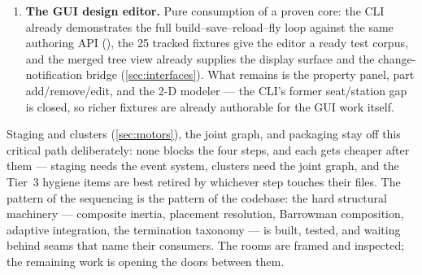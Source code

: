 \begin{enumerate}
  \item \textbf{The GUI design editor.} Pure consumption of a proven core: the CLI already
  demonstrates the full build--save--reload--fly loop against the same authoring API
  (), the 25 tracked  fixtures give the editor a ready test
  corpus, and the merged tree view already supplies the display surface and the
  change-notification bridge (\cref{sec:interfaces}). What remains is the property panel, part
  add/remove/edit, and the 2-D modeler --- the CLI's former seat/station gap is closed, so richer
  fixtures are already authorable for the GUI work itself.

\end{enumerate}

Staging and clusters (\cref{sec:motors}), the joint graph, and packaging stay off this critical
path deliberately: none blocks the four steps, and each gets cheaper after them --- staging needs
the event system, clusters need the joint graph, and the Tier~3 hygiene items are best retired by
whichever step touches their files. The pattern of the sequencing is the pattern of the codebase:
the hard structural machinery --- composite inertia, placement resolution, Barrowman composition,
adaptive integration, the termination taxonomy --- is built, tested, and waiting behind seams that
name their consumers. The rooms are framed and inspected; the remaining work is opening the doors
between them.
